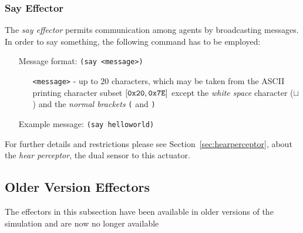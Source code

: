\subsubsection{Say Effector}
\label{sec:sayeffector}

The \emph{say effector} permits communication among agents by broadcasting
messages. In order to say something, the following command has to be employed:
\begin{itemize}
	\item[Message format:] \texttt{(say <message>)}
		\begin{itemize}
		  \item[\texttt{<message>} -] up to 20 characters, which may be taken
		  from the ASCII  printing character subset $[{\tt 0x20}, {\tt 0x7E]}$ except
		  the {\it white space}  character ($\sqcup$) and the {\it normal brackets}
		  {\tt(} and {\tt )}
		\end{itemize}
	\item[Example message:] \texttt{(say helloworld)}
\end{itemize}
For further details and restrictions please see Section~\ref{sec:hearperceptor},
about the \emph{hear perceptor}, the dual sensor to this actuator.





\subsection{Older Version Effectors}
\label{sec:olderversioneffectors}
The effectors in this subsection have been available in older versions of the
simulation and are now no longer available



